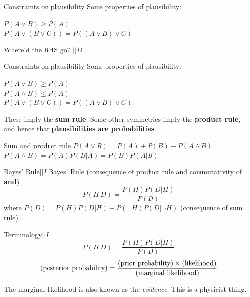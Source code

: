 \documentclass{beamer}
\begin{document}
\begin{frame}[t]{Constraints on plausibility}
Some properties of plausibility:\vspace{20pt}

$P(A \vee B) \geq P(A)$\\
$P(A \vee (B \vee C)) = P((A \vee B) \vee C)$\vspace{20pt}

Where'd the RHS go? $|| D$
\end{frame}

\begin{frame}[t]{Constraints on plausibility}
Some properties of plausibility:\vspace{20pt}

$P(A \vee B) \geq P(A)$\\
$P(A \wedge B) \leq P(A)$\\
$P(A \vee (B \vee C)) = P((A \vee B) \vee C)$\vspace{20pt}

These imply the {\bf sum rule}.
Some other symmetries imply the {\bf product rule}, and hence that
{\bf plausibilities are probabilities}.
\end{frame}

\begin{frame}[t]{Sum and product rule}
$P(A \vee B) = P(A) + P(B) - P(A \wedge B)$\\
\vspace{20pt}
$P(A \wedge B) = P(A)P(B|A) = P(B)P(A|B)$
\end{frame}

\begin{frame}[t]{Bayes' Rule\hspace{170pt}$|| I$}
Bayes' Rule (consequence of product rule and commutativity of {\bf and})
\begin{equation}
P(H | D) = \frac{P(H)P(D|H)}{P(D)}
\end{equation}
where\vspace{20pt}
$P(D) = P(H)P(D | H) + P(\neg H)P(D | \neg H)$
(consequence of sum rule)
\end{frame}

\begin{frame}[t]{Terminology\hspace{170pt}$|| I$}
\begin{equation}
P(H | D) = \frac{P(H)P(D|H)}{P(D)}
\end{equation}
\begin{equation}
\textnormal{(posterior probability)} =
\frac{\textnormal{(prior probability)}\times\textnormal{(likelihood)}}{\textnormal{(marginal likelihood)}}
\end{equation}
\vspace{20pt}

The marginal likelihood is also known as the {\it evidence}. This is a
physicist thing.
\end{frame}
\end{document}
